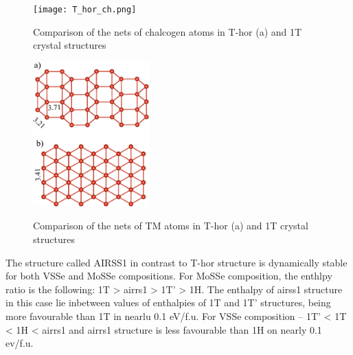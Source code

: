 \documentclass[a4paperm]{article}
\begin{document}
\begin{figure}[H]
	\texttt{[image: T\_hor\_ch.png]} \\
	\caption{Comparison of the nets of chalcogen atoms in T-hor (a) and 1T crystal structures }
	\label{T_hor_ch}
\end{figure}

\begin{figure}[H]
	\includegraphics[width=0.4\textwidth]{T_hor_V.png} \\
	\caption{Comparison of the nets of TM atoms in T-hor (a) and 1T crystal structures }
	\label{T_hor_V}
\end{figure}


The structure called AIRSS1 in contrast to T-hor structure is dynamically stable for both VSSe and MoSSe compositions.
For MoSSe composition, the enthlpy ratio is the following: 1T > airrs1 > 1T' > 1H.
The enthalpy of airss1 structure in this case lie inbetween values of enthalpies of 1T and 1T' structures, being more favourable than 1T in nearlu 0.1 eV/f.u.
For VSSe composition -- 1T' < 1T < 1H < airrs1 and airrs1 structure is less favourable than 1H on nearly 0.1 ev/f.u.
\end{document}
